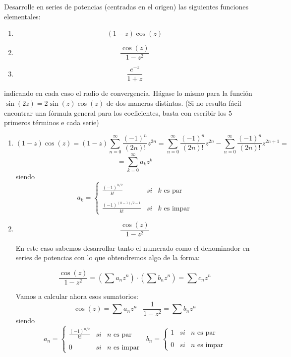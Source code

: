 \begin{problem}[5]
Desarrolle en series de potencias (centradas en el origen) las siguientes funciones elementales:
\begin{enumerate}
\item \[(1-z)\cos(z)\]
\item \[\frac{\cos(z)}{1-z^2}\]
\item \[\frac{e^{-z}}{1+z}\]
\end{enumerate}

indicando en cada caso el radio de convergencia. Hágase lo mismo para la función $\sin(2z)=2\sin(z)\cos(z)$ de dos maneras distintas. (Si no resulta fácil encontrar una fórmula general para los coeficientes, basta con escribir los 5 primeros términos e cada serie)
\solution

\begin{enumerate}
\item

\[(1-z)\cos(z) = (1-z)\sum_{n=0}^{\infty}\frac{(-1)^n}{(2n)!}z^{2n}=\sum_{n=0}^{\infty}\frac{(-1)^n}{(2n)!}z^{2n}-\sum_{n=0}^{\infty}\frac{(-1)^n}{(2n)!}z^{2n+1} =\]
\[= \sum_{k=0}^{\infty}a_kz^k\]
siendo
\[a_k= \left\{ \begin{array}{lcc}
             \frac{(-1)^{k/2}}{k!} &   si  & k \text{ es par} \\
             \\ \frac{(-1)^{(k-1)/2-1}}{k!} &  si  & k \text{ es impar}
             \end{array}
   \right.\]


\item
\[\frac{\cos(z)}{1-z^2}\]

En este caso sabemos desarrollar tanto el numerado como el denominador en series de potencias con lo que obtendremos algo de la forma:

\[\frac{\cos(z)}{1-z^2} = \left(\sum a_n z^n \right)\cdot \left( \sum b_nz^n\right)=\sum c_n z^n\]

Vamos a calcular ahora esos sumatorios:
\[\cos(z)=\sum a_n z^n \; \; \; \frac{1}{1-z^2} = \sum b_n z^n\]
siendo
\[a_n= \left\{ \begin{array}{lcc}
             \frac{(-1)^{n/2}}{k!} &   si  & n \text{ es par} \\
             \\0  &  si  & n \text{ es impar}
             \end{array}
   \right.  \; \; b_n= \left\{ \begin{array}{lcc}
             1 &   si  & n \text{ es par} \\
             \\0  &  si  & n \text{ es impar}
             \end{array}
   \right.\]


\end{enumerate}
\end{problem}
